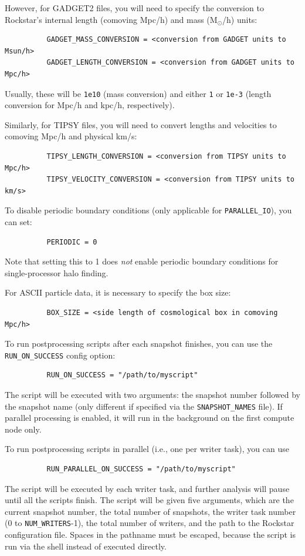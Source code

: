 \documentclass[12pt]{article}
\begin{document}
      However, for GADGET2 files, you will need to specify the conversion to
      Rockstar's internal length (comoving Mpc/h) and mass (M$_\odot$/h) units:
\begin{verbatim}
          GADGET_MASS_CONVERSION = <conversion from GADGET units to Msun/h>
          GADGET_LENGTH_CONVERSION = <conversion from GADGET units to Mpc/h>
\end{verbatim}
      Usually, these will be \texttt{1e10} (mass conversion) and either \texttt{1} or
      \texttt{1e-3} (length conversion for Mpc/h and kpc/h, respectively).

      Similarly, for TIPSY files, you will need to convert lengths and
      velocities to comoving Mpc/h and physical km/s:
\begin{verbatim}
          TIPSY_LENGTH_CONVERSION = <conversion from TIPSY units to Mpc/h>
          TIPSY_VELOCITY_CONVERSION = <conversion from TIPSY units to km/s>
\end{verbatim}
      To disable periodic boundary conditions (only applicable for \texttt{PARALLEL\_IO}),
      you can set:
\begin{verbatim}      
          PERIODIC = 0
\end{verbatim}
      Note that setting this to 1 does \textit{not} enable periodic boundary conditions
      for single-processor halo finding.

      For ASCII particle data, it is necessary to specify the box size:
\begin{verbatim}
      	  BOX_SIZE = <side length of cosmological box in comoving Mpc/h>
\end{verbatim}

      To run postprocessing scripts after each snapshot finishes, you can use
      the \texttt{RUN\_ON\_SUCCESS} config option:
\begin{verbatim}
      	  RUN_ON_SUCCESS = "/path/to/myscript"
\end{verbatim}
      The script will be executed with two arguments: the snapshot number
      followed by the snapshot name (only different if specified via the
      \texttt{SNAPSHOT\_NAMES} file).  If parallel processing is enabled, it
      will run in the background on the first compute node only.
      
      To run postprocessing scripts in parallel (i.e., one per writer task), you can use 
\begin{verbatim}
      	  RUN_PARALLEL_ON_SUCCESS = "/path/to/myscript"
\end{verbatim}
	The script will be executed by each writer task, and further analysis will pause
	until all the scripts finish.  The script will be given five arguments, which are the current snapshot
	number, the total number of snapshots, the writer task number (0 to \texttt{NUM\_WRITERS}-1),
	the total number of writers, and the path to the Rockstar configuration file.  Spaces in the pathname must be escaped, because the script is run via the shell instead of executed directly.
\end{document}
